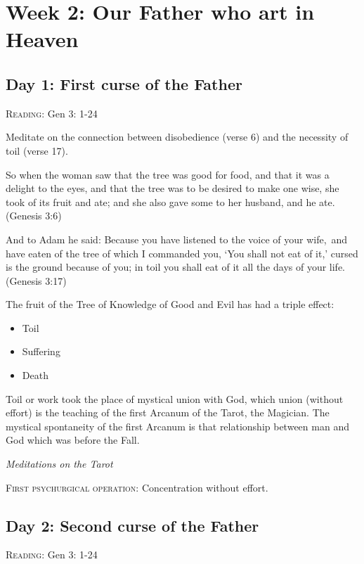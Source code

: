 \section{Week 2: Our Father who art in Heaven}

\subsection*{Day 1: First curse of the Father}
\textsc{Reading}: Gen 3: 1-24

Meditate on the connection between disobedience (verse 6) and the necessity of toil (verse 17).

So when the woman saw that the tree was good for food, and that it was a delight to the eyes, and that the tree was to
be desired to make one wise, she took of its fruit and ate; and she also gave some to her husband, and he ate. (Genesis
3:6)

And to Adam he said: Because you have listened to the voice of your wife, and have eaten of the tree of which I
commanded you, `You shall not eat of it,' cursed is the ground because of
you; in toil you shall eat of it all the days of your life. (Genesis 3:17)

\begin{quotationx}
The fruit of the Tree of Knowledge of Good and Evil has had a triple effect:

\begin{itemize}
\item Toil 
\item Suffering 
\item Death 
\end{itemize}

Toil or work took the place of mystical union with God, which union (without effort) is the teaching of the first
Arcanum of the Tarot, the Magician. The mystical spontaneity of the first Arcanum is that relationship between man and
God which was before the Fall. 
\begin{flushright}\textit{Meditations on the Tarot}\end{flushright}

\end{quotationx}
\textsc{First psychurgical operation}: Concentration without effort.

\subsection*{Day 2: Second curse of the Father}
\textsc{Reading}: Gen 3: 1-24

